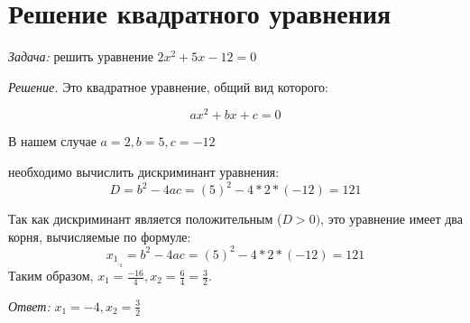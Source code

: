 \documentclass{article}
\begin{document}
\section{Решение квадратного уравнения}

\textit {Задача:} решить уравнение $2x^2 + 5x - 12 = 0$

\textit {Решение.} Это квадратное уравнение, общий вид которого:

\[ ax^2 + bx + c= 0 \]

В нашем случае $a = 2, b = 5, c = -12$

 необходимо вычислить дискриминант уравнения:
\[D = b^2 - 4ac = (5)^2 - 4 * 2 * (-12) = 121\]

Так как дискриминант является положительным ($D > 0)$, это уравнение
имеет два корня, вычисляемые по формуле:
\[x_1_,_2 = b^2 - 4ac = (5)^2 - 4 * 2 * (-12) = 121\]
Таким образом, $x_1 = \frac{-16}{4} , x_2 = \frac{6}{4} = \frac{3}{2}.$

\quad \textit{Ответ:} $x_1 = -4, x_2 = \frac{3}{2}$
\end{document}

